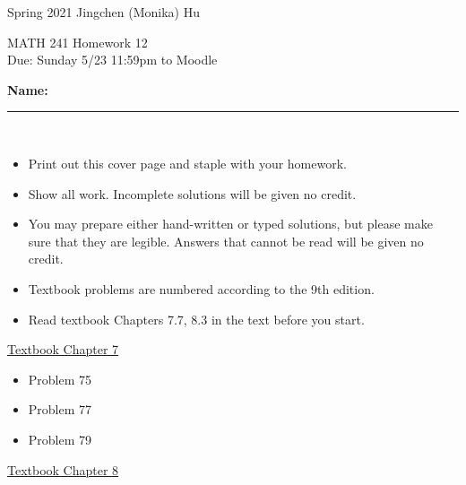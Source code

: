 \documentclass[11pt]{article}
\begin{document}
\enlargethispage{\baselineskip}

Spring 2021 \hfill Jingchen (Monika) Hu\\

\begin{center}
{\huge MATH 241 Homework 12}	\\
Due: Sunday 5/23 11:59pm to Moodle
\end{center}
\vspace{0.5cm}

\textbf{Name:} \rule{6cm}{0.5pt}\\


{\bf
\begin{itemize}
\item Print out this cover page and staple with your homework.
\item Show all work. Incomplete solutions will be given no credit.
\item You may prepare either hand-written or typed solutions, but please make sure that they are legible.
Answers that cannot be read will be given no credit.
\item Textbook problems are numbered according to the 9th edition.
\item Read textbook Chapters 7.7, 8.3 in the text before you start.

\end{itemize}
}


\underline{Textbook  Chapter 7   }

\begin{itemize}


    \item
    Problem 75

    \item
    Problem 77

    \item
    Problem 79


%
%


\end{itemize}


\underline{Textbook  Chapter 8   }
\end{document}
